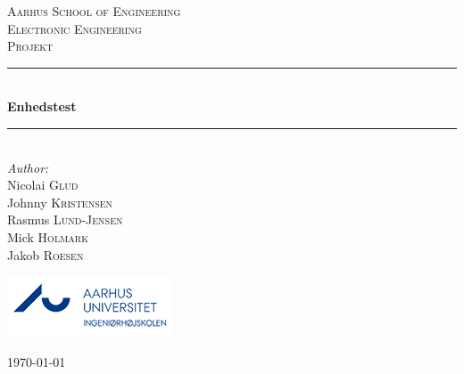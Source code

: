 \newcommand{\HRule}{\rule{\linewidth}{0.5mm}} %

\begin{center} %
 

\textsc{\LARGE Aarhus School of Engineering}\\[1.5cm] %
\textsc{\Large Electronic Engineering}\\[0.5cm] %
\textsc{\large Projekt}\\[0.5cm] %


\HRule \\[0.4cm]
{ \huge \bfseries Enhedstest}\\[0.4cm] %
\HRule \\[1.5cm]
 

\Large \emph{Author:}\\
Nicolai \textsc{Glud}\\ %
Johnny \textsc{Kristensen}\\
Rasmus \textsc{Lund-Jensen}\\
Mick \textsc{Holmark}\\
Jakob \textsc{Roesen}



\includegraphics{billeder/iha_logo_da.png}\\[1cm] %
 

\vfill %

{\large \today}\\[3cm] %
\end{center}
